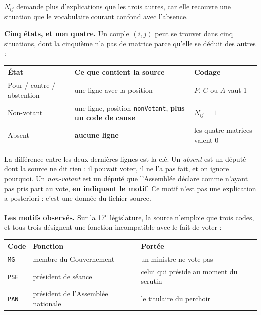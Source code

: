 \documentclass[11pt,a4paper]{article}
\newcommand{\code}[1]{\texttt{#1}}
\begin{document}
$N_{ij}$ demande plus d'explications que les trois autres, car elle recouvre
une situation que le vocabulaire courant confond avec l'absence.

\textbf{Cinq états, et non quatre.} Un couple $(i,j)$ peut se trouver dans cinq
situations, dont la cinquième n'a pas de matrice parce qu'elle se déduit des
autres :

\begin{center}
\begin{tabular}{>{\raggedright\arraybackslash}p{.20\linewidth}p{.36\linewidth}p{.34\linewidth}}
\toprule
État & Ce que contient la source & Codage \\
\midrule
Pour / contre / abstention & une ligne avec la position & $P$, $C$ ou $A$ vaut 1 \\
Non-votant & une ligne, position \code{nonVotant}, \textbf{plus un code de cause} & $N_{ij}=1$ \\
Absent & \textbf{aucune ligne} & les quatre matrices valent 0 \\
\bottomrule
\end{tabular}
\end{center}

La différence entre les deux dernières lignes est la clé. Un \emph{absent} est
un député dont la source ne dit rien : il pouvait voter, il ne l'a pas fait, et
on ignore pourquoi. Un \emph{non-votant} est un député que l'Assemblée déclare
comme n'ayant pas pris part au vote, \textbf{en indiquant le motif}. Ce motif
n'est pas une explication a posteriori : c'est une donnée du fichier source.

\textbf{Les motifs observés.} Sur la 17\textsuperscript{e} législature, la
source n'emploie que trois codes, et tous trois désignent une fonction
incompatible avec le fait de voter :

\begin{center}
\begin{tabular}{>{\raggedright\arraybackslash}p{.10\linewidth}p{.46\linewidth}p{.34\linewidth}}
\toprule
Code & Fonction & Portée \\
\midrule
\code{MG}  & membre du Gouvernement & un ministre ne vote pas \\
\code{PSE} & président de séance & celui qui préside au moment du scrutin \\
\code{PAN} & président de l'Assemblée nationale & le titulaire du perchoir \\
\bottomrule
\end{tabular}
\end{center}
\end{document}

